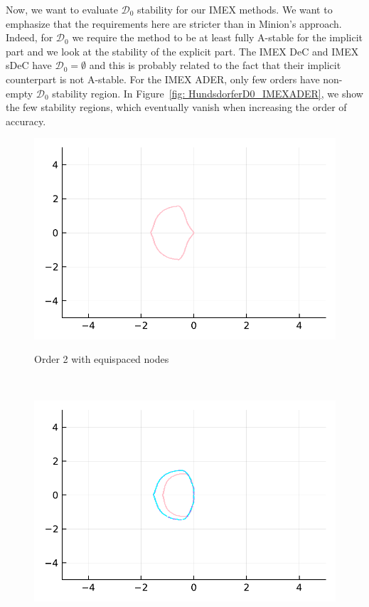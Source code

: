 Now, we want to evaluate $\mathcal{D}_0$ stability for our IMEX methods. 
We want to emphasize that the requirements here are stricter than in Minion's approach. 
Indeed, for $\mathcal{D}_0$ we require the method to be at least fully A-stable for the implicit part and we look at the stability of the explicit part.
The IMEX DeC and IMEX sDeC have $\mathcal{D}_0=\emptyset$ and this is probably related to the fact that their implicit counterpart is not A-stable.
For the IMEX ADER, only few orders have non-empty $\mathcal{D}_0$ stability region. In Figure~\ref{fig: HundsdorferD0_IMEXADER}, we show the few stability regions, which eventually vanish when increasing the order of accuracy.
\begin{figure}
	\centering
	\begin{minipage}[t]{0.4\textwidth}
		\includegraphics[width=\textwidth]{pdf/odepics/ImExD0_IMEXADER_equispaced.pdf}
		\centerline{Order 2 with equispaced nodes}
	\end{minipage}\,\,
	\begin{minipage}[t]{0.4\textwidth}
		\includegraphics[width=\textwidth]{pdf/odepics/ImExD0_IMEXADER_gaussLobatto.pdf}

\end{minipage}
\end{figure}
